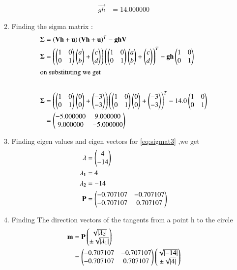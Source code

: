 \begin{enumerate}[label=\thesection.\arabic*,ref=\thesection.\theenumi]
\begin{enumerate}
\begin{align}
\vec{gh} &= 14.000000  
\end{align}
%
\item Finding the sigma matrix : 
\begin{align}
	\vec{\Sigma} &= \brak{\vec{V}\vec{h}+\vec{u}}\brak{\vec{V}\vec{h}+\vec{u}}^T -\vec{gh}\vec{V}  \label{eq:sigmat}\\
	\vec{\Sigma} &= \brak{\myvec{1 &0 \\0 & 1}\myvec{a \\ b}+\myvec{c \\ d}} \brak{\myvec{1 &0 \\0 & 1}\myvec{a \\b}+\myvec{c \\ d}}^T - \vec{gh}\myvec{1 &0 \\ 0& 1}   \label{eq:sigmat2} \\
\intertext{on substituting we get  }   \nonumber \\ 
	\vec{\Sigma} &= \brak{\myvec{1 &0 \\ 0 &1}\myvec{0 \\ 0 }+\myvec{-3 \\  -3}} \brak{\myvec{1 &0 \\ 0&1}\myvec{0 \\ 0}+\myvec{-3 \\ -3}}^T - 14.0 \myvec{1 &0 \\ 0& 1 } \\
	&= \myvec{-5.000000  & 9.000000 \\ 9.000000 & -5.000000 } \label{eq:sigmat3}
\end{align}
%
\item  Finding eigen values and eigen vectors for \eqref{eq:sigmat3} ,we get 
	\begin{align}
		\mathbf{\lambda} &=\begin{pmatrix}4\\-14\end{pmatrix} \\
		\mathbf{\lambda_1} &=4 \\
		\mathbf{\lambda_2} &=-14  \\
		\mathbf{P} &=\begin{pmatrix} -0.707107& -0.707107\\ -0.707107 & 0.707107\end{pmatrix} 
	\end{align}
%
\item Finding  The direction vectors of the tangents from a point h to the circle
\begin{align}
	\vec{m} &=\vec{P}\myvec{\sqrt{\abs{\lambda_2}}\\ \pm \sqrt{\abs{\lambda_1}}} \\
		&=\myvec{ -0.707107& -0.707107\\ -0.707107 & 0.707107}\myvec{\sqrt{\abs{-14}}\\ \pm \sqrt{\abs{4}}} \\

\end{align}
\end{enumerate}
\end{enumerate}
